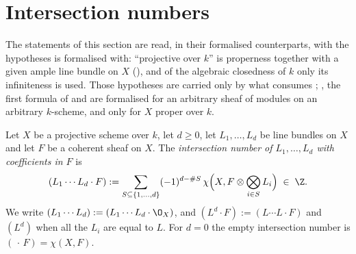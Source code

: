 \section{Intersection numbers}\label{sec:deg-intersection}

\begin{remark}
\label{rem:deg-intersection-hypotheses}
The statements of this section are read, in their formalised counterparts, with
the hypotheses  is formalised with: ``projective over
$k$'' is properness together with a given ample line bundle on $X$
(), and of the algebraic closedness of $k$ only
its infiniteness is used.  Those hypotheses are carried only by what consumes
; , the first formula of
 and
 are formalised for an arbitrary sheaf of
modules on an arbitrary $k$-scheme, and 
only for $X$ proper over $k$.
\end{remark}

\begin{definition}\label{def:deg-intersection}
\leanok
{}
Let $X$ be a projective scheme over $k$, let $d\geq0$, let $L_1,\dots,L_d$ be
line bundles on $X$ and let $F$ be a coherent sheaf on $X$.  The
\emph{intersection number of $L_1,\dots,L_d$ with coefficients in $F$} is
\[
  (L_1\cdots L_d\cdot F):=
  \sum_{S\subseteq\{1,\dots,d\}}(-1)^{d-\#S}\,
  \chi\Bigl(X,F\otimes\bigotimes_{i\in S}L_i\Bigr)\;\in\;\Z .
\]
We write $(L_1\cdots L_d):=(L_1\cdots L_d\cdot\O_X)$, and
$(L^d\cdot F):=(L\cdots L\cdot F)$ and $(L^d)$ when all the $L_i$ are equal to
$L$.  For $d=0$ the empty intersection number is $(\,\cdot\,F)=\chi(X,F)$.
\end{definition}

